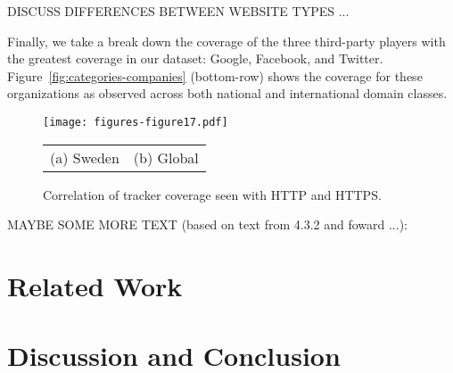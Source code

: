 \documentclass{sig-alternate-10pt}
\begin{document}
DISCUSS DIFFERENCES BETWEEN WEBSITE TYPES ...

Finally, we take a break down the coverage of the three third-party players
with the greatest coverage in our dataset: Google, Facebook, and Twitter.
Figure~\ref{fig:categories-companies} (bottom-row) shows the coverage for these organizations 
as observed across both national and international domain classes.


\begin{figure}[t]
\centering
\texttt{[image: figures-figure17.pdf]}
\begin{tabular}{cc}
(a) Sweden &
(b) Global \\
\end{tabular}
\caption{Correlation of tracker coverage seen with HTTP and HTTPS.}
\label{fig:scatter}
\vspace{-0pt}
\end{figure}

MAYBE SOME MORE TEXT (based on text from 4.3.2 and foward ...):






\section{Related Work}\label{sec:related}


\section{Discussion and Conclusion}\label{sec:conclusions}



\newpage


%
\vspace{8pt}

\end{document}
